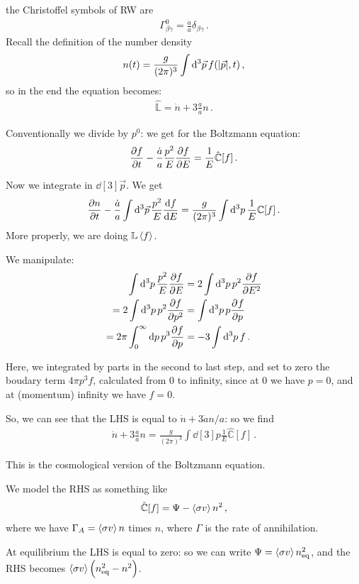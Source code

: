 \documentclass[main.tex]{subfiles}
\begin{document}

the Christoffel symbols of RW are 
%
\begin{align}
  \Gamma^{0}_{\beta \gamma } = \frac{\dot{a}}{a} \delta_{\beta \gamma }
\,.
\end{align}
%
Recall the definition of the number density 
%
\begin{align}
  n(t) = \frac{g}{(2\pi )^3} \int  \dd[3]{\vec{p}} f(\abs{\vec{p}}, t) 
\,,
\end{align}
%
so in the end the equation becomes: 
%
\begin{align}
  \hat{\mathbb{L}} = \dot{n} + 3 \frac{\dot{a}}{a} n 
\,. 
\end{align}
%

Conventionally we divide by \(p^{0}\): we get for the Boltzmann equation: 
%
\begin{align}
  \pdv{f}{t} - \frac{\dot{a}}{a } \frac{p^2}{E} \pdv{f}{E} = \frac{1}{E} \hat{\mathbb{C}} [f]
\,.
\end{align}

Now we integrate in \(\dd[3]{\vec{p}}\). We get 
%
\begin{align}
  \pdv{n}{t} - \frac{\dot{a}}{a } \int  \dd[3]{\vec{p}} \frac{p^2}{E} \dv{f}{E} = \frac{g }{(2\pi )^3} \int  \dd[3]{p} \frac{1}{E} \mathbb{C} [f]  
\,.
\end{align}
%
More properly, we are doing \(\mathbb{L} \expval{f}\). 

We manipulate: 
%
\begin{align}
  \int \dd[3]{p} \frac{p^2}{E} \pdv{f}{E} 
  &= 2 \int \dd[3]{p} p^2 \pdv{f}{E^2} \\
  = 2 \int \dd[3]{p} p^2 \pdv{f}{p^2} 
  &= \int \dd[3]{p} p \pdv[]{f}{p} \\
  = 2 \pi \int_{0}^{ \infty } \dd{p} p^3 \pdv{f}{p} 
  &= -3 \int \dd[3]{p} f
\,.
\end{align}
%

Here, we integrated by parts in the second to last step, and set to zero the boudary term \(4 \pi p^3 f\), calculated from 0 to infinity, since at \(0\) we have \(p=0\), and at (momentum) infinity we have \(f=0\).

So, we can see that the LHS is equal to \(\dot{n} + 3 \dot{a}n/a \): so we find 
%
\begin{align}
  \dot{n} + 3 \frac{\dot{a}}{a} n = \frac{g}{(2 \pi )^3} \int \dd[3]{p} \frac{1}{E} \hat{\mathbb{C}} [f]
\,.
\end{align}

This is the cosmological version of the Boltzmann equation. 

We model the RHS as something like 
%
\begin{align}
  \hat{\mathbb{C}}[f] = \Psi - \expval{\sigma v } n^2
\,,
\end{align}
%
where we have \(\Gamma_A = \expval{\sigma v} n\) times \(n\), where \(\Gamma \) is the rate of annihilation. 

At equilibrium the LHS is 
equal to zero: so we can write \(\Psi = \expval{\sigma v} n^2 _{\text{eq}}\), and the RHS becomes \(\expval{\sigma v} \qty(n^2 _{\text{eq}} - n^2)\).
\end{document}
